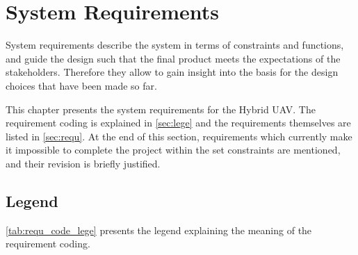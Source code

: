 \chapter{System Requirements}
\setlength{\parindent}{15pt}
\label{ch:tech_requ}

System requirements describe the system in terms of constraints and functions, and guide the design such that the final product meets the expectations of the stakeholders. Therefore they allow to gain insight into the basis for the design choices that have been made so far.

This chapter presents the system requirements for the Hybrid UAV. The requirement coding is explained in \autoref{sec:lege} and the requirements themselves are listed in \autoref{sec:requ}. At the end of this section, requirements which currently make it impossible to complete the project within the set constraints are mentioned, and their revision is briefly justified.

\section{Legend}
\label{sec:lege}

\autoref{tab:requ_code_lege} presents the legend explaining the meaning of the requirement coding.

